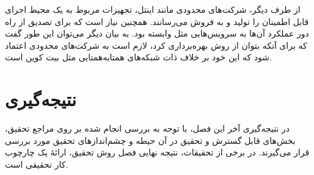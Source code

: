 از طرف دیگر، شرکت‌های محدودی مانند اینتل، تجهیزات مربوط به یک محیط اجرای قابل اطمینان را تولید و به فروش می‌رسانند. همچنین نیاز است که برای  تصدیق از راه دور عملکرد آن‌ها به سرویس‌هایی مثل \cite{EPID} وابسته بود. به بیان دیگر می‌توان این طور گفت که برای آنکه بتوان از روش \cite{Matetic2019} بهره‌برداری کرد، لازم است به شرکت‌های محدودی اعتماد شود که این خود بر خلاف ذات شبکه‌های همتابه‌همتایی مثل بیت کوین است.



\section{نتیجه‌گیری}
‌در نتیجه‌گیری آخر این فصل، با توجه به بررسی انجام شده بر روی مراجع تحقیق، بخش‌های قابل گسترش و تحقیق در آن حیطه و چشم‌اندازهای تحقیق مورد بررسی قرار می‌گیرند.	در برخی از تحقیقات، نتیجه نهایی فصل روش تحقیق، ارائهٔ یک چارچوب کار تحقیقی 
است.